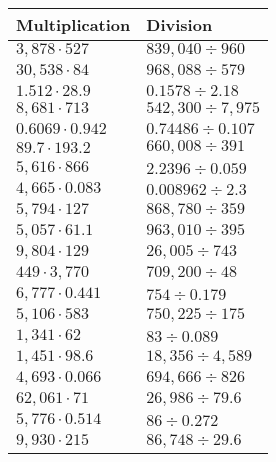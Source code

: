 \begin{longtable}[]{@{}ll@{}}
\toprule
Multiplication & Division\tabularnewline
\midrule
\endhead
\(3,878\cdot527\) & \(839,040÷960\)\tabularnewline
\(30,538\cdot84\) & \(968,088÷579\)\tabularnewline
\(1.512\cdot28.9\) & \(0.1578÷2.18\)\tabularnewline
\(8,681\cdot713\) & \(542,300÷7,975\)\tabularnewline
\(0.6069\cdot0.942\) & \(0.74486÷0.107\)\tabularnewline
\(89.7\cdot193.2\) & \(660,008÷391\)\tabularnewline
\(5,616\cdot866\) & \(2.2396÷0.059\)\tabularnewline
\(4,665\cdot0.083\) & \(0.008962÷2.3\)\tabularnewline
\(5,794\cdot127\) & \(868,780÷359\)\tabularnewline
\(5,057\cdot61.1\) & \(963,010÷395\)\tabularnewline
\(9,804\cdot129\) & \(26,005÷743\)\tabularnewline
\(449\cdot3,770\) & \(709,200÷48\)\tabularnewline
\(6,777\cdot0.441\) & \(754÷0.179\)\tabularnewline
\(5,106\cdot583\) & \(750,225÷175\)\tabularnewline
\(1,341\cdot62\) & \(83÷0.089\)\tabularnewline
\(1,451\cdot98.6\) & \(18,356÷4,589\)\tabularnewline
\(4,693\cdot0.066\) & \(694,666÷826\)\tabularnewline
\(62,061\cdot71\) & \(26,986÷79.6\)\tabularnewline
\(5,776\cdot0.514\) & \(86÷0.272\)\tabularnewline
\(9,930\cdot215\) & \(86,748÷29.6\)\tabularnewline
\bottomrule
\end{longtable}
